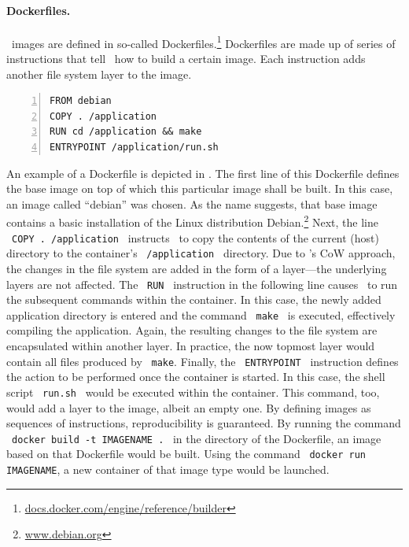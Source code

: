 \paragraph{Dockerfiles.}
\docker\ images are defined in so-called Dockerfiles.\footnote{\url{docs.docker.com/engine/reference/builder}} Dockerfiles are made up of series of instructions that tell \docker\ how to build a certain image. Each instruction adds another file system layer to the image.
\begin{lstlisting}[caption=An examplary Dockerfile, label=lst:dockerfile, numbers=left, numberstyle=\tiny]
FROM debian
COPY . /application
RUN cd /application && make
ENTRYPOINT /application/run.sh
\end{lstlisting}
An example of a Dockerfile is depicted in . The first line of this Dockerfile defines the base image on top of which this particular image shall be built. In this case, an image called ``debian'' was chosen. As the name suggests, that base image contains a basic installation of the Linux distribution Debian.\footnote{\url{www.debian.org}} Next, the line \ \mbox{\texttt{COPY . /application}} \ instructs \docker\ to copy the contents of the current (host) directory to the container's \ \mbox{\texttt{/application}} \ directory. Due to \docker 's CoW approach, the changes in the file system are added in the form of a layer---the underlying layers are not affected. The \ \texttt{RUN} \ instruction in the following line causes \docker\ to run the subsequent commands within the container. In this case, the newly added application directory is entered and the command \ \texttt{make} \ is executed, effectively compiling the application. Again, the resulting changes to the file system are encapsulated within another layer. In practice, the now topmost layer would contain all files produced by \ \texttt{make}. Finally, the \ \mbox{\texttt{ENTRYPOINT}} \ instruction defines the action to be performed once the container is started. In this case, the shell script \ \texttt{run.sh} \ would be executed within the container. This command, too, would add a layer to the image, albeit an empty one. By defining images as sequences of instructions, reproducibility is guaranteed.
By running the command \ \mbox{\texttt{docker build -t IMAGENAME .}} \ in the directory of the Dockerfile, an image based on that Dockerfile would be built. Using the command \ \mbox{\texttt{docker run IMAGENAME}}, a new container of that image type would be launched.

